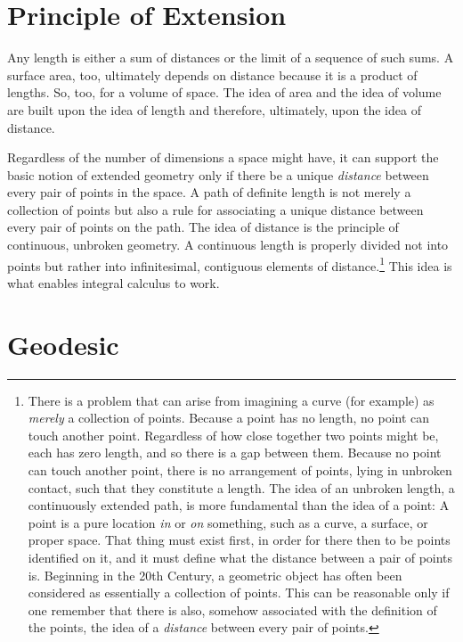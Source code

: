 \section{Principle of Extension}

Any length is either a sum of distances or the limit of a sequence of such
sums. A surface area, too, ultimately depends on distance because it is a
product of lengths.  So, too, for a volume of space.  The idea of area and the
idea of volume are built upon the idea of length and therefore, ultimately,
upon the idea of distance.

Regardless of the number of dimensions a space might have, it can support the
basic notion of extended geometry only if there be a unique \emph{distance}
between every pair of points in the space.  A path of definite length is not
merely a collection of points but also a rule for associating a unique distance
between every pair of points on the path.  The idea of distance is the
principle of continuous, unbroken geometry.  A continuous length is properly
divided not into points but rather into infinitesimal, contiguous elements of
distance.\footnote{%
   There is a problem that can arise from imagining a curve (for example) as
   \emph{merely} a collection of points.  Because a point has no length, no
   point can touch another point.  Regardless of how close together two points
   might be, each has zero length, and so there is a gap between them.  Because
   no point can touch another point, there is no arrangement of points, lying
   in unbroken contact, such that they constitute a length.  The idea of an
   unbroken length, a continuously extended path, is more fundamental than the
   idea of a point:  A point is a pure location \emph{in} or \emph{on}
   something, such as a curve, a surface, or proper space.  That thing must
   exist first, in order for there then to be points identified on it, and it
   must define what the distance between a pair of points is.  Beginning in the
   20th Century, a geometric object has often been considered as essentially a
   collection of points.  This can be reasonable only if one remember that
   there is also, somehow associated with the definition of the points, the
   idea of a \emph{distance} between every pair of points.%
}
This idea is what enables integral calculus to work.

\section{Geodesic}

